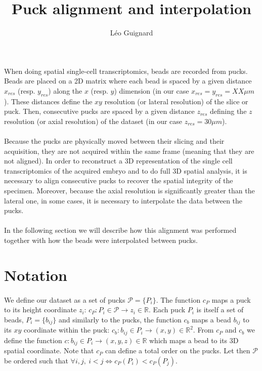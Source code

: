 \documentclass[10pt,a4paper]{article}
\author{L\'eo Guignard}
\title{Puck alignment and interpolation}
\begin{document}
\maketitle
\paragraph{}When doing spatial single-cell transcriptomics, beads are recorded from pucks.
Beads are placed on a 2D matrix where each bead is spaced by a given distance $x_{res}$ (resp.
$y_{res}$) along the $x$ (resp.
$y$) dimension (in our case $x_{res}=y_{res}=XX \mu m$).
These distances define the $xy$ resolution (or lateral resolution) of the slice or puck.
Then, consecutive pucks are spaced by a given distance $z_{res}$ defining the $z$ resolution (or axial resolution) of the dataset (in our case $z_{res}=30\mu m$).
\paragraph{}Because the pucks are physically moved between their slicing and their acquisition, they are not acquired within the same frame (meaning that they are not aligned).
In order to reconstruct a 3D representation of the single cell transcriptomics of the acquired embryo and to do full 3D spatial analysis, it is necessary to align consecutive pucks to recover the spatial integrity of the specimen.
Moreover, because the axial resolution is significantly greater than the lateral one, in some cases, it is necessary to interpolate the data between the pucks.
\paragraph{}In the following section we will describe how this alignment was performed together with how the beads were interpolated between pucks.
\section{Notation}
\paragraph{}We define our dataset as a set of pucks \(\mathcal{P}=\{P_i\}\).
The function $c_P$ maps a puck to its height coordinate $z_i$: \(c_P: P_i\in \mathcal{P} \rightarrow z_i \in \mathbb{R}\).
Each puck $P_i$ is itself a set of beads, \(P_i=\{b_{ij}\}\) and similarly to the pucks, the function \(c_b\) maps a bead \(b_{ij}\) to its \(xy\) coordinate within the puck: \(c_b:b_{ij}\in P_i\rightarrow (x,y)\in \mathbb{R}^2\).
From \(c_P\) and \(c_b\) we define the function \(c:b_{ij}\in P_i\rightarrow (x,y,z)\in\mathbb{R}\) which maps a bead to its 3D spatial coordinate.
Note that \(c_P\) can define a total order on the pucks.
Let then \(\mathcal{P}\) be ordered such that \(\forall i,j,~i<j\iff c_P(P_i)<c_P(P_j)\).
%
\end{document}
